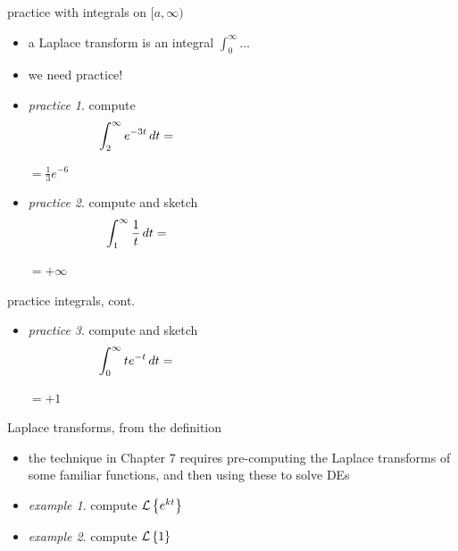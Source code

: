 \documentclass[dvipsnames,colorlinks]{beamer}
\begin{document}
\begin{frame}{practice with integrals on $[a,\infty)$}

\begin{itemize}
\item a Laplace transform is an integral $\int_0^\infty \dots$
\item we need practice!
\item \emph{practice 1}.  compute
    $$\int_2^\infty e^{-3t}\,dt = \hspace{60mm}$$

\vspace{10mm}
\hfill $=\frac{1}{3} e^{-6}$
\item \emph{practice 2}.  compute and sketch
    $$\int_1^\infty \frac{1}{t}\,dt = \hspace{60mm}$$

\vspace{10mm}
\hfill $=+\infty$
\end{itemize}
\end{frame}


\begin{frame}{practice integrals, cont.}

\begin{itemize}
\item \emph{practice 3}.  compute and sketch
    $$\int_0^\infty t e^{-t}\,dt = \hspace{60mm}$$

\vspace{20mm}
\hfill $=+1$

\vspace{10mm}
\end{itemize}
\end{frame}


\begin{frame}{Laplace transforms, from the definition}

\begin{itemize}
\item the technique in Chapter 7 requires pre-computing the Laplace transforms of some familiar functions, and then using these to solve DEs
\item \emph{example 1}.  compute $\mathcal{L}\left\{e^{kt}\right\}$

\vspace{25mm}
\item \emph{example 2}.  compute $\mathcal{L}\left\{1\right\}$

\vspace{25mm}
\end{itemize}
\end{frame}
\end{document}

